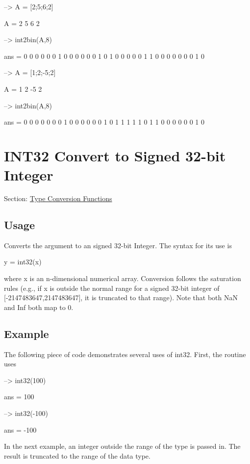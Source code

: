 \begin{DoxyVerbInclude}
--> A = [2;5;6;2]

A = 
 2 
 5 
 6 
 2 

--> int2bin(A,8)

ans = 
 0 0 0 0 0 0 1 0 
 0 0 0 0 0 1 0 1 
 0 0 0 0 0 1 1 0 
 0 0 0 0 0 0 1 0 

--> A = [1;2;-5;2]

A = 
  1 
  2 
 -5 
  2 

--> int2bin(A,8)

ans = 
 0 0 0 0 0 0 0 1 
 0 0 0 0 0 0 1 0 
 1 1 1 1 1 0 1 1 
 0 0 0 0 0 0 1 0 
\end{DoxyVerbInclude}
 \hypertarget{typecast_int32}{}\section{I\-N\-T32 Convert to Signed 32-\/bit Integer}\label{typecast_int32}
Section\-: \hyperlink{sec_typecast}{Type Conversion Functions} \hypertarget{vtkwidgets_vtkxyplotwidget_Usage}{}\subsection{Usage}\label{vtkwidgets_vtkxyplotwidget_Usage}
Converts the argument to an signed 32-\/bit Integer. The syntax for its use is \begin{DoxyVerb}   y = int32(x)
\end{DoxyVerb}
 where {\ttfamily x} is an {\ttfamily n}-\/dimensional numerical array. Conversion follows the saturation rules (e.\-g., if {\ttfamily x} is outside the normal range for a signed 32-\/bit integer of {\ttfamily \mbox{[}-\/2147483647,2147483647\mbox{]}}, it is truncated to that range). Note that both {\ttfamily Na\-N} and {\ttfamily Inf} both map to 0. \hypertarget{variables_struct_Example}{}\subsection{Example}\label{variables_struct_Example}
The following piece of code demonstrates several uses of {\ttfamily int32}. First, the routine uses


\begin{DoxyVerbInclude}
--> int32(100)

ans = 
 100 

--> int32(-100)

ans = 
 -100 
\end{DoxyVerbInclude}


In the next example, an integer outside the range of the type is passed in. The result is truncated to the range of the data type.


